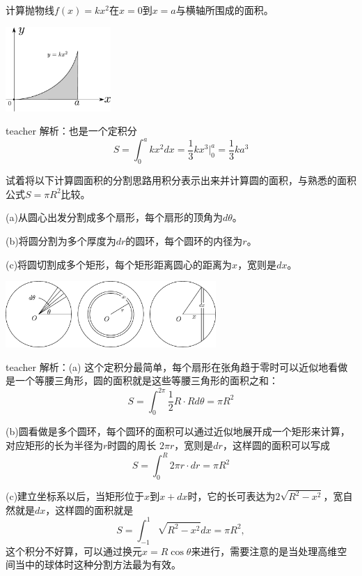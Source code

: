 \begin{example}
计算抛物线$f(x)=kx^2$在$x=0$到$x=a$与横轴所围成的面积。 
\begin{flushright}
\includegraphics[width=0.3\textwidth]{images/cal-16.pdf} 
\end{flushright}
\begin{taggedblock}{teacher}
\noindent
解析：也是一个定积分
\[
S =\int_0^a kx^2 dx = \frac{1}{3}kx^3\bigg\vert_0^a=\frac{1}{3}ka^3
\]
\end{taggedblock}
\end{example}


\begin{example}
试着将以下计算圆面积的分割思路用积分表示出来并计算圆的面积，与熟悉的面积公式$S=\pi R^2$比较。

(a)从圆心出发分割成多个扇形，每个扇形的顶角为$d\theta$。

(b)将圆分割为多个厚度为$dr$的圆环，每个圆环的内径为$r$。

(c)将圆切割成多个矩形，每个矩形距离圆心的距离为$x$，宽则是$dx$。

\begin{flushright}
\includegraphics[width = 0.6\textwidth]{images/cal-17.pdf} 
\end{flushright}


\begin{taggedblock}{teacher}
\noindent
解析：(a) 这个定积分最简单，每个扇形在张角趋于零时可以近似地看做是一个等腰三角形，圆的面积就是这些等腰三角形的面积之和：
\[
S = \int_0^{2\pi}\frac{1}{2}R\cdot Rd\theta = \pi R^2
\]

(b)圆看做是多个圆环，每个圆环的面积可以通过近似地展开成一个矩形来计算，对应矩形的长为半径为$r$时圆的周长 $2\pi r$，宽则是$dr$，这样圆的面积可以写成
\[
S = \int_0^R2\pi r\cdot dr = \pi R^2
\]

(c)建立坐标系以后，当矩形位于$x$到$x+dx$时，它的长可表达为$2\sqrt{R^2-x^2}$，宽自然就是$dx$，这样圆的面积就是
\[
S=\int_{-1}^1\sqrt{R^2-x^2}dx = \pi R^2,
\]
这个积分不好算，可以通过换元$x=R\cos\theta$来进行，需要注意的是当处理高维空间当中的球体时这种分割方法最为有效。
\end{taggedblock}
\end{example}

